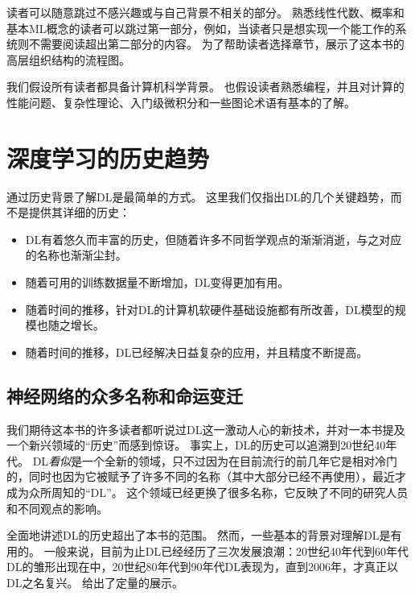 读者可以随意跳过不感兴趣或与自己背景不相关的部分。
熟悉线性代数、概率和基本\gls{ML}概念的读者可以跳过第一部分，例如，当读者只是想实现一个能工作的系统则不需要阅读超出第二部分的内容。
为了帮助读者选择章节，展示了这本书的高层组织结构的流程图。


我们假设所有读者都具备计算机科学背景。
也假设读者熟悉编程，并且对计算的性能问题、复杂性理论、入门级微积分和一些图论术语有基本的了解。
% 
\section{深度学习的历史趋势}
\label{sec:historical_trends_in_deep_learning}
通过历史背景了解\gls{DL}是最简单的方式。
这里我们仅指出\gls{DL}的几个关键趋势，而不是提供其详细的历史：
\begin{itemize}
 \item \gls{DL}有着悠久而丰富的历史，但随着许多不同哲学观点的渐渐消逝，与之对应的名称也渐渐尘封。
 \item 随着可用的训练数据量不断增加，\gls{DL}变得更加有用。
 \item 随着时间的推移，针对\gls{DL}的计算机软硬件基础设施都有所改善，\gls{DL}模型的规模也随之增长。
 \item 随着时间的推移，\gls{DL}已经解决日益复杂的应用，并且精度不断提高。
\end{itemize}

\subsection{神经网络的众多名称和命运变迁}
\label{sec:the_many_names_and_changing_fortunes_of_neural_networks}

我们期待这本书的许多读者都听说过\gls{DL}这一激动人心的新技术，并对一本书提及一个新兴领域的``历史''而感到惊讶。
事实上，\gls{DL}的历史可以追溯到20世纪40年代。
\gls{DL}\emph{看似}是一个全新的领域，只不过因为在目前流行的前几年它是相对冷门的，同时也因为它被赋予了许多不同的名称（其中大部分已经不再使用），最近才成为众所周知的``\gls{DL}''。
这个领域已经更换了很多名称，它反映了不同的研究人员和不同观点的影响。

全面地讲述\gls{DL}的历史超出了本书的范围。
然而，一些基本的背景对理解\gls{DL}是有用的。
一般来说，目前为止\gls{DL}已经经历了三次发展浪潮：20世纪40年代到60年代\gls{DL}的雏形出现在中，20世纪80年代到90年代\gls{DL}表现为，直到2006年，才真正以\gls{DL}之名复兴。
给出了定量的展示。

